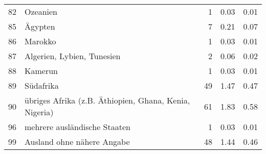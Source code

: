 \begin{longtable}{lXrrr}
        82 & \multicolumn{1}{X}{Ozeanien} & %
          \num{1} &
          \num[round-mode=places,round-precision=2]{0.03} &
          \num[round-mode=places,round-precision=2]{0.01} \\

        85 & \multicolumn{1}{X}{Ägypten} & %
          \num{7} &
          \num[round-mode=places,round-precision=2]{0.21} &
          \num[round-mode=places,round-precision=2]{0.07} \\

        86 & \multicolumn{1}{X}{Marokko} & %
          \num{1} &
          \num[round-mode=places,round-precision=2]{0.03} &
          \num[round-mode=places,round-precision=2]{0.01} \\

        87 & \multicolumn{1}{X}{Algerien, Lybien, Tunesien} & %
          \num{2} &
          \num[round-mode=places,round-precision=2]{0.06} &
          \num[round-mode=places,round-precision=2]{0.02} \\

        88 & \multicolumn{1}{X}{Kamerun} & %
          \num{1} &
          \num[round-mode=places,round-precision=2]{0.03} &
          \num[round-mode=places,round-precision=2]{0.01} \\

        89 & \multicolumn{1}{X}{Südafrika} & %
          \num{49} &
          \num[round-mode=places,round-precision=2]{1.47} &
          \num[round-mode=places,round-precision=2]{0.47} \\

        90 & \multicolumn{1}{X}{übriges Afrika (z.B. Äthiopien, Ghana, Kenia, Nigeria)} & %
          \num{61} &
          \num[round-mode=places,round-precision=2]{1.83} &
          \num[round-mode=places,round-precision=2]{0.58} \\

        96 & \multicolumn{1}{X}{mehrere ausländische Staaten} & %
          \num{1} &
          \num[round-mode=places,round-precision=2]{0.03} &
          \num[round-mode=places,round-precision=2]{0.01} \\

        99 & \multicolumn{1}{X}{Ausland ohne nähere Angabe} & %
          \num{48} &
          \num[round-mode=places,round-precision=2]{1.44} &
          \num[round-mode=places,round-precision=2]{0.46} \\


\end{longtable}
